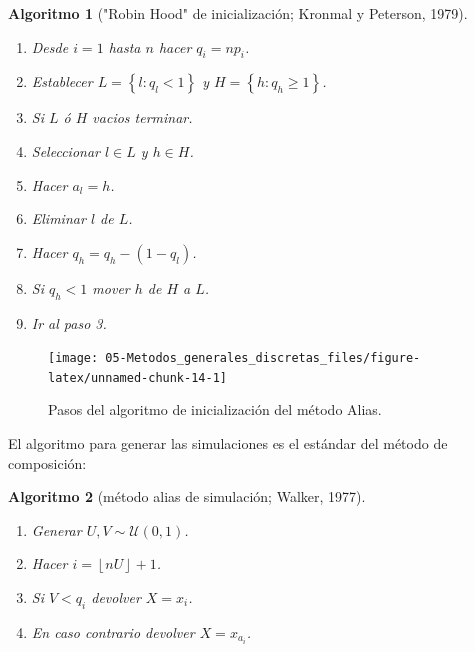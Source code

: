 \documentclass[
]{book}
\theoremstyle{break}
\newtheorem{conjecture}{Algoritmo}[chapter]
\theoremstyle{nonumberplain}
\begin{document}
\begin{conjecture}["Robin Hood" de inicialización; Kronmal y Peterson, 1979]
\protect\hypertarget{cnj:robin-hood}{}\label{cnj:robin-hood}

\begin{enumerate}
\def\labelenumi{\arabic{enumi}.}
\item
  Desde \(i=1\) hasta \(n\) hacer \(q_{i}=np_{i}\).
\item
  Establecer \(L=\left\{ l:q_{l}<1\right\}\) y
  \(H=\left\{ h:q_{h}\geq 1\right\}\).
\item
  Si \(L\) ó \(H\) vacios terminar.
\item
  Seleccionar \(l\in L\) y \(h\in H\).
\item
  Hacer \(a_{l}=h\).
\item
  Eliminar \(l\) de \(L\).
\item
  Hacer \(q_{h}=q_{h}-\left( 1-q_{l}\right)\).
\item
  Si \(q_{h}<1\) mover \(h\) de \(H\) a \(L\).
\item
  Ir al paso 3.
\end{enumerate}

\end{conjecture}

\begin{figure}[!htb]

{\centering \texttt{[image: 05-Metodos\_generales\_discretas\_files/figure-latex/unnamed-chunk-14-1]} 

}

\caption{Pasos del algoritmo de inicialización del método Alias.}\label{fig:unnamed-chunk-14}
\end{figure}

El algoritmo para generar las simulaciones es el estándar del método de composición:

\begin{conjecture}[método alias de simulación; Walker, 1977]
\protect\hypertarget{cnj:walker}{}\label{cnj:walker}

\begin{enumerate}
\def\labelenumi{\arabic{enumi}.}
\item
  Generar \(U,V\sim \mathcal{U}\left( 0,1\right)\).
\item
  Hacer \(i=\left\lfloor nU\right\rfloor +1\).
\item
  Si \(V<q_{i}\) devolver \(X=x_{i}\).
\item
  En caso contrario devolver \(X=x_{a_{i}}\).
\end{enumerate}

\end{conjecture}
\end{document}
